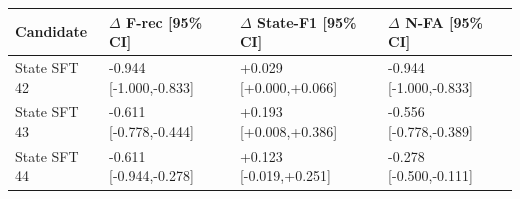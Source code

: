 \begin{tabular}{llll}
\toprule
Candidate & $\Delta$ F-rec [95\% CI] & $\Delta$ State-F1 [95\% CI] & $\Delta$ N-FA [95\% CI] \\
\midrule
State SFT 42 & -0.944 [-1.000,-0.833] & +0.029 [+0.000,+0.066] & -0.944 [-1.000,-0.833] \\
State SFT 43 & -0.611 [-0.778,-0.444] & +0.193 [+0.008,+0.386] & -0.556 [-0.778,-0.389] \\
State SFT 44 & -0.611 [-0.944,-0.278] & +0.123 [-0.019,+0.251] & -0.278 [-0.500,-0.111] \\
\bottomrule
\end{tabular}
